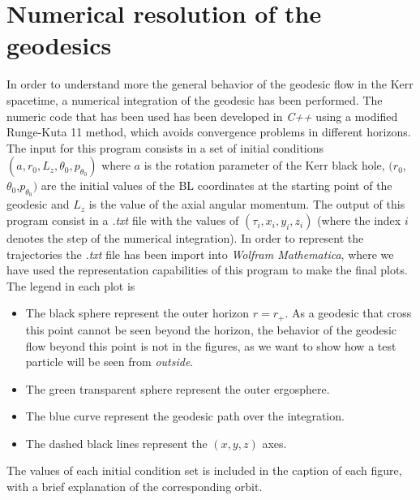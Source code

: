 \chapter{Numerical resolution of the geodesics}\label{ch:nsog} %

In order to understand more the general behavior of the geodesic flow in the Kerr spacetime, a numerical integration of the geodesic has been performed. The numeric code that has been used has been developed in \textit{C++} using a modified Runge-Kuta 11 method, which avoids convergence problems in different horizons. The input for this program consists in a set of initial conditions $(a,r_0,L_z,\theta_0,p_{\theta_0})$ where $a$ is the rotation parameter of the Kerr black hole, $(r_0$,$\theta_0$,$p_{\theta_0})$ are the initial values of the \gls{BL} coordinates at the starting point of the geodesic and $L_z$ is the value of the axial angular momentum. The output of this program consist in a \textit{.txt} file with the values of $(\tau_i,x_i,y_i,z_i)$ (where the index $i$ denotes the step of the numerical integration). In order to represent the trajectories the \textit{.txt} file has been import into \textit{Wolfram Mathematica}, where we have used the representation capabilities of this program to make the final plots. The legend in each plot is

\begin{itemize}
 \item The black sphere represent the outer horizon $r=r_+$. As a geodesic that cross this point cannot be seen beyond the horizon, the behavior of the geodesic flow beyond this point is not in the figures, as we want to show how a test particle will be seen from \textit{outside}.
 \item The green transparent sphere represent the outer ergosphere.
 \item The blue curve represent the geodesic path over the integration.
 \item The dashed black lines represent the $(x,y,z)$ axes.
\end{itemize}

The values of each initial condition set is included in the caption of each figure, with a brief explanation of the corresponding orbit.





